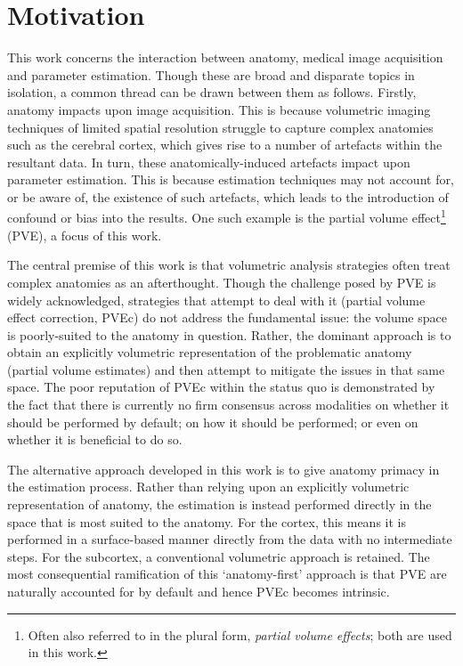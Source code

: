 \documentclass[12pt]{report}
\begin{document}
\section{Motivation}

This work concerns the interaction between anatomy, medical image acquisition and parameter estimation. Though these are broad and disparate topics in isolation, a common thread can be drawn between them as follows. Firstly, anatomy impacts upon image acquisition. This is because volumetric imaging techniques of limited spatial resolution struggle to capture complex anatomies such as the cerebral cortex, which gives rise to a number of artefacts within the resultant data. In turn, these anatomically-induced artefacts impact upon parameter estimation. This is because estimation techniques may not account for, or be aware of, the existence of such artefacts, which leads to the introduction of confound or bias into the results. One such example is the partial volume effect\footnote{Often also referred to in the plural form, \textit{partial volume effects}; both are used in this work.} (PVE), a focus of this work. 

The central premise of this work is that volumetric analysis strategies often treat complex anatomies as an afterthought. Though the challenge posed by PVE is widely acknowledged, strategies that attempt to deal with it (partial volume effect correction, PVEc) do not address the fundamental issue: the volume space is poorly-suited to the anatomy in question. Rather, the dominant approach is to obtain an explicitly volumetric representation of the problematic anatomy (partial volume estimates) and then attempt to mitigate the issues in that same space. The poor reputation of PVEc within the status quo is demonstrated by the fact that there is currently no firm consensus across modalities on whether it should be performed by default; on how it should be performed; or even on whether it is beneficial to do so. 

The alternative approach developed in this work is to give anatomy primacy in the estimation process. Rather than relying upon an explicitly volumetric representation of anatomy, the estimation is instead performed directly in the space that is most suited to the anatomy. For the cortex, this means it is performed in a surface-based manner directly from the data with no intermediate steps. For the subcortex, a conventional volumetric approach is retained. The most consequential ramification of this `anatomy-first' approach is that PVE are naturally accounted for by default and hence PVEc becomes intrinsic.  
\end{document}
